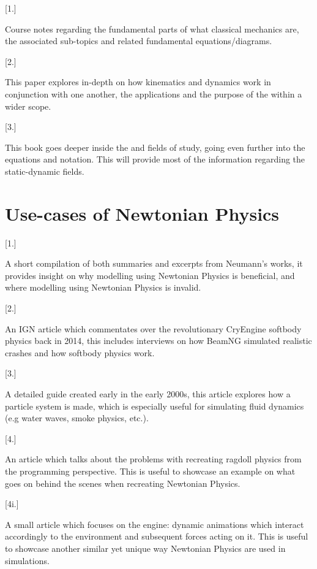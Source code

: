 \documentclass[12pt]{article}
\begin{document}

[1.] \parencite{classical_mechanics_intro} \par Course notes regarding the fundamental parts of 
what classical mechanics are, the associated sub-topics and related fundamental equations/diagrams.  

[2.] \parencite{kinematics} \par This paper explores in-depth on how kinematics and dynamics work in conjunction with one another,
the applications and the purpose of the  within a wider scope.

[3.] \parencite{static_dynamic} \par This book goes deeper inside the  and  fields of study,
going even further into the equations and notation. This will provide most of the information regarding the static-dynamic fields.

\section{Use-cases of Newtonian Physics}

[1.] \parencite{neumann_compendium} \par A short compilation of both summaries and excerpts from Neumann's works,
it provides insight on why modelling using Newtonian Physics is beneficial, and where modelling using 
Newtonian Physics is invalid.

[2.] \parencite{beamng_softbody_physics} \par An IGN article which commentates over the revolutionary CryEngine softbody physics
back in 2014, this includes interviews on how BeamNG simulated realistic crashes and how softbody physics work.

[3.] \parencite{particle_system_manual} \par A detailed guide created early in the early 2000s, this article explores how a particle
system is made, which is especially useful for simulating fluid dynamics (e.g water waves, smoke physics, etc.).

[4.] \parencite{ragdoll_physics} \par An article which talks about the problems with recreating ragdoll physics
from the programming perspective. This is useful to showcase an example on what goes on behind the scenes 
when recreating Newtonian Physics.

[4i.] \parencite{naturalmotion_euphoria} \par A small article which focuses on the  engine: 
dynamic animations which interact accordingly to the environment and subsequent forces acting on it. This is useful to showcase
another similar yet unique way Newtonian Physics are used in simulations.
\end{document}
